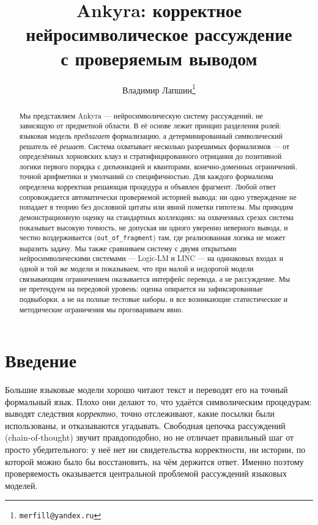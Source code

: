 \documentclass[11pt,a4paper]{article}
\title{Ankyra: корректное нейросимволическое рассуждение\\
с проверяемым выводом}
\author{Владимир Лапшин\thanks{\texttt{merfill@yandex.ru}}}
\date{}
\begin{document}
\maketitle

\begin{abstract}
Мы представляем Ankyra — нейросимволическую систему рассуждений, не зависящую от предметной области. В её основе лежит принцип разделения ролей: языковая
модель \emph{предлагает} формализацию, а детерминированный символический решатель её \emph{решает}. Система охватывает несколько разрешимых формализмов
 — от определённых хорновских клауз и стратифицированного отрицания до позитивной логики первого порядка с дизъюнкцией и кванторами, конечно-доменных
ограничений, точной арифметики и умолчаний со специфичностью. Для каждого формализма определена корректная решающая процедура и объявлен фрагмент.
Любой ответ сопровождается автоматически проверяемой историей вывода; ни одно утверждение не попадает в теорию без дословной цитаты или явной пометки
гипотезы. Мы приводим демонстрационную оценку на стандартных коллекциях: на охваченных срезах система показывает высокую точность, не допуская ни
одного уверенно неверного вывода, и честно воздерживается (\texttt{out\_of\_fragment}) там, где реализованная логика не может выразить задачу.
Мы также сравниваем систему с двумя открытыми нейросимволическими системами — Logic-LM и LINC — на одинаковых входах и одной и той же модели и показываем,
что при малой и недорогой модели связывающим ограничением оказывается интерфейс перевода, а не рассуждение.
Мы не претендуем на передовой уровень: оценка опирается на зафиксированные подвыборки, а не на полные тестовые наборы, и все возникающие статистические
и методические ограничения мы проговариваем явно.
\end{abstract}

\section{Введение}
\label{sec:intro}

Большие языковые модели хорошо читают текст и переводят его на точный формальный язык. Плохо они делают то, что удаётся символическим процедурам: выводят
следствия \emph{корректно}, точно отслеживают, какие посылки были использованы, и отказываются угадывать. Свободная цепочка рассуждений (chain-of-thought)
звучит правдоподобно, но не отличает правильный шаг от просто убедительного: у неё нет ни свидетельства корректности, ни истории, по которой можно было
бы восстановить, на чём держится ответ. Именно поэтому проверяемость оказывается центральной проблемой рассуждений языковых моделей.
\end{document}
